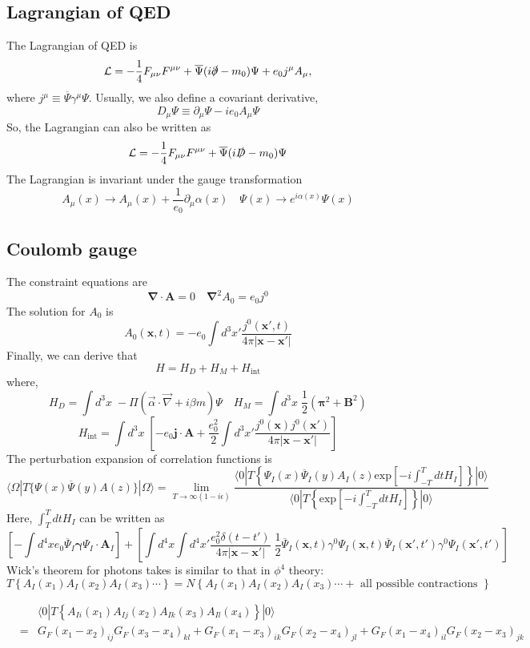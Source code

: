 \documentclass[cyan]{elegantnote}
\begin{document}
\subsection{Lagrangian of QED}
\noindent
The Lagrangian of QED is
\[\mathcal{L} = -\frac{1}{4}F_{\mu\nu}F^{\mu\nu} + \overline{\Psi} (i\slashed{\partial}-m_0) \Psi + e_0j^{\mu} A_{\mu}, \]
where $j^{\mu} \equiv \overline{\Psi}\gamma^{\mu}\Psi$. Usually, we also define a covariant derivative,
\[D_{\mu}\Psi \equiv \partial_{\mu}\Psi -ie_0A_{\mu}\Psi \]
So, the Lagrangian can also be written as
\[\mathcal{L} = -\frac{1}{4}F_{\mu\nu}F^{\mu\nu} + \overline{\Psi} (i\slashed{D}-m_0) \Psi\]
The Lagrangian is invariant under the gauge transformation
\[A_{\mu}(x) \to A_{\mu}(x) + \frac{1}{e_0}\partial_{\mu}\alpha(x) \quad \Psi(x) \to e^{i\alpha(x)} \Psi(x)\]

\subsection{Coulomb gauge}
\noindent
The constraint equations are
\[\bm{\nabla} \cdot \bm{A} = 0 \quad \bm{\nabla}^2 A_0 = e_0j^0\]
The solution for $A_0$ is
\[A_0(\bm{x},t) = -e_0 \int d^3 x' \frac{j^0(\bm{x}',t)}{4\pi|\bm{x}-\bm{x}'|}\]
Finally, we can derive that
\[H = H_{D} + H_{M} + H_{\mathrm{int}}\]
where,
\[H_{D} = \int d^3 x \; -\Pi (\vec{\alpha} \cdot \vec{\nabla} + i \beta m)\Psi \quad H_{M} = \int d^3x \; \frac{1}{2}(\bm{\pi}^2 + \bm{B}^2)\]
\[H_{\mathrm{int}} = \int d^3x \; \left[-e_0\bm{j}\cdot\bm{A} + \frac{e_0^2}{2} \int d^3x' \frac{j^0(\bm{x}) j^0(\bm{x}')}{4\pi|\bm{x}-\bm{x}'|} \right]\]
The perturbation expansion of correlation functions is
\[\langle \Omega | T \{\Psi(x) \overline{\Psi}(y) A(z) \} | \Omega \rangle = \lim_{T \to \infty(1-i\epsilon)} \frac{\langle 0 | T \left\{ \Psi_I(x) \overline{\Psi}_I(y) A_I(z) \mathrm{exp} \left[ -i \int_{-T}^{T} dt H_I \right]\right\} | 0 \rangle}{\langle 0 | T \left\{ \mathrm{exp} \left[ -i \int_{-T}^{T} dt H_I \right]\right\} | 0 \rangle}\]
Here, $\int_{T}^{T} dt H_I$ can be written as
\[\left[-\int d^4x e_0\overline{\Psi}_I\bm{\gamma}\Psi_I\cdot\bm{A}_I \right] +\left[ \int d^4x \int d^4x' \frac{e_0^2\delta(t-t')}{4\pi|\bm{x}-\bm{x}'|}\; \frac{1}{2} \overline{\Psi}_I(\bm{x},t)\gamma^0 \Psi_I(\bm{x},t) \overline{\Psi}_I(\bm{x}',t')\gamma^0 \Psi_I(\bm{x}',t') \right]\]
Wick’s theorem for photons takes is similar to that in $\phi^4$ theory:
\[T \left\{ A_I(x_1) A_I(x_2)  A_I(x_3) \cdots \right\} = N \left\{A_I(x_1) A_I(x_2)  A_I(x_3) \cdots + \mbox{ all possible contractions }\right\} \]
\begin{example}
\begin{eqnarray}
&& \langle 0 | T \left\{ A_{Ii}(x_1) A_{Ij}(x_2) A_{Ik}(x_3) A_{Il}(x_4)\right\}| 0 \rangle \nonumber \\
&=&  G_F(x_1-x_2)_{ij} G_F(x_3-x_4)_{kl} + G_F(x_1-x_3)_{ik}G_F(x_2-x_4)_{jl} +  G_F(x_1-x_4)_{il}G_F(x_2-x_3)_{jk} \nonumber
\end{eqnarray}
\end{example}
\end{document}
